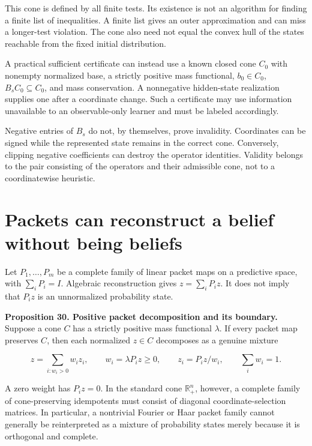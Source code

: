 This cone is defined by all finite tests. Its existence is not an
algorithm for finding a finite list of inequalities. A finite list gives
an outer approximation and can miss a longer-test violation. The cone
also need not equal the convex hull of the states reachable from the
fixed initial distribution.

A practical sufficient certificate can instead use a known closed cone
\(C_0\) with nonempty normalized base, a strictly positive mass
functional, \(b_0\in C_0\), \(B_sC_0\subseteq C_0\), and mass
conservation. A nonnegative hidden-state realization supplies one after
a coordinate change. Such a certificate may use information unavailable
to an observable-only learner and must be labeled accordingly.

Negative entries of \(B_s\) do not, by themselves, prove invalidity.
Coordinates can be signed while the represented state remains in the
correct cone. Conversely, clipping negative coefficients can destroy the
operator identities. Validity belongs to the pair consisting of the
operators and their admissible cone, not to a coordinatewise heuristic.

\section{Packets can reconstruct a belief without being beliefs}\label{LSM:packets-can-reconstruct-a-belief-without-being-beliefs}

Let \(P_1,\ldots,P_m\) be a complete family of linear packet maps on a
predictive space, with \(\sum_iP_i=I\). Algebraic reconstruction gives
\(z=\sum_iP_iz\). It does not imply that \(P_iz\) is an unnormalized
probability state.

\textbf{Proposition 30. Positive packet decomposition and its boundary.}
Suppose a cone \(C\) has a strictly positive mass functional
\(\lambda\). If every packet map preserves \(C\), then each normalized
\(z\in C\) decomposes as a genuine mixture

\[
z=\sum_{i:w_i>0} w_i z_i,\qquad
w_i=\lambda P_iz\geq0,\qquad
z_i=P_iz/w_i,\qquad\sum_iw_i=1.
\]

A zero weight has \(P_iz=0\). In the standard cone \(\mathbb R^n_+\),
however, a complete family of cone-preserving idempotents must consist
of diagonal coordinate-selection matrices. In particular, a nontrivial
Fourier or Haar packet family cannot generally be reinterpreted as a
mixture of probability states merely because it is orthogonal and
complete.

